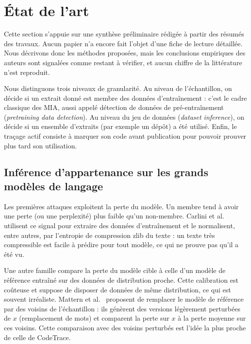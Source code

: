 \section{État de l'art}\label{sec:etat-art}
	Cette section s'appuie sur une synthèse préliminaire rédigée à partir des résumés des travaux. Aucun papier n'a encore fait l'objet d'une fiche de lecture détaillée. Nous décrivons donc les méthodes proposées, mais les conclusions empiriques des auteurs sont signalées comme restant à vérifier, et aucun chiffre de la littérature n'est reproduit.

	Nous distinguons trois niveaux de granularité. Au niveau de l'échantillon, on décide si un extrait donné est membre des données d'entraînement : c'est le cadre classique des MIA, aussi appelé détection de données de pré-entraînement (\emph{pretraining data detection}). Au niveau du jeu de données (\emph{dataset inference}), on décide si un ensemble d'extraits (par exemple un dépôt) a été utilisé. Enfin, le traçage actif consiste à marquer son code avant publication pour pouvoir prouver plus tard son utilisation.

	\subsection{Inférence d'appartenance sur les grands modèles de langage}\label{sec:ea-mia}
		Les premières attaques exploitent la perte du modèle. Un membre tend à avoir une perte (ou une perplexité) plus faible qu'un non-membre. Carlini et al.~\cite{carlini2021} utilisent ce signal pour extraire des données d'entraînement et le normalisent, entre autres, par l'entropie de compression zlib du texte : un texte très compressible est facile à prédire pour tout modèle, ce qui ne prouve pas qu'il a été vu.

		Une autre famille compare la perte du modèle cible à celle d'un modèle de référence entraîné sur des données de distribution proche. Cette calibration est coûteuse et suppose de disposer de données de même distribution, ce qui est souvent irréaliste. Mattern et al.~\cite{mattern2023} proposent de remplacer le modèle de référence par des voisins de l'échantillon : ils génèrent des versions légèrement perturbées de $x$ (remplacement de mots) et comparent la perte sur $x$ à la perte moyenne sur ces voisins. Cette comparaison avec des voisins perturbés est l'idée la plus proche de celle de CodeTrace.


